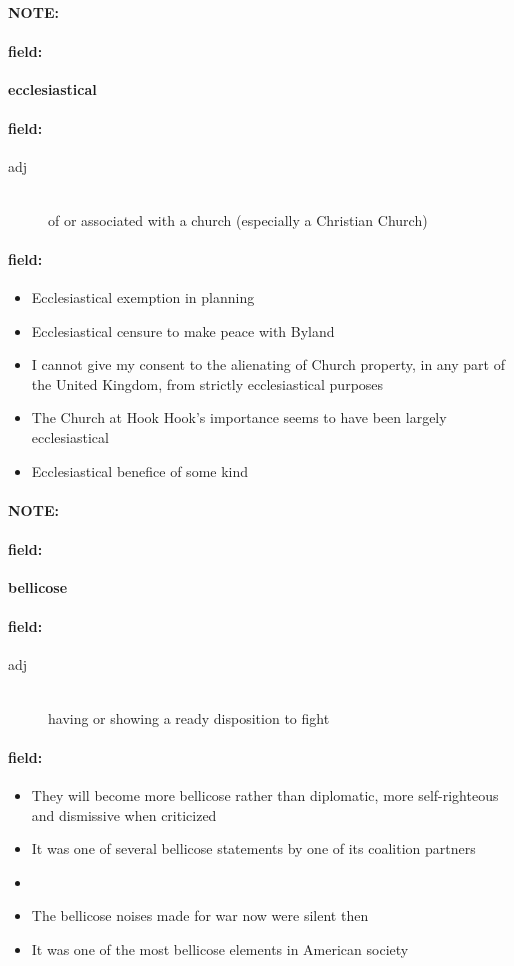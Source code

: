\documentclass[12pt]{article}
\newenvironment{note}{\paragraph{NOTE:}}{}
\newenvironment{field}{\paragraph{field:}}{}
\begin{document}
\begin{note}
\begin{field}
\textbf{\large ecclesiastical}
\end{field}


\begin{field}
\begin{description}
\item[adj] \hfill \\ 
of or associated with a church (especially a Christian Church)

\end{description}
\end{field}

\begin{field}
\begin{itemize}
\item Ecclesiastical exemption in planning
\item Ecclesiastical censure to make peace with Byland
\item I cannot give my consent to the alienating of Church property, in any part of the United Kingdom, from strictly ecclesiastical purposes
\item The Church at Hook Hook's importance seems to have been largely ecclesiastical
\item Ecclesiastical benefice of some kind
\end{itemize}
\end{field}
\end{note}
\begin{note}
\begin{field}
\textbf{\large bellicose}
\end{field}


\begin{field}
\begin{description}
\item[adj] \hfill \\ 
having or showing a ready disposition to fight

\end{description}
\end{field}

\begin{field}
\begin{itemize}
\item They will become more bellicose rather than diplomatic, more self-righteous and dismissive when criticized
\item It was one of several bellicose statements by one of its coalition partners
\item 
\item The bellicose noises made for war now were silent then
\item It was one of the most bellicose elements in American society
\end{itemize}
\end{field}
\end{note}
\end{document}
